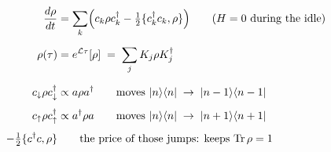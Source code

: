 \documentclass[12pt]{article}
\begin{document}
\fontsize{20}{26}\selectfont
\begin{align*}
\frac{d\rho}{dt}
  &= \sum_k \Bigl(
       c_k\rho c_k^\dagger
       -\tfrac12\{c_k^\dagger c_k,\rho\}
     \Bigr)
  \qquad (H=0\text{ during the idle}) \\[0.55em]
\rho(\tau)
  &= e^{\mathcal{L}\tau}[\rho]
  \;=\;
  \sum_j K_j\rho K_j^\dagger \\[0.65em]
c_\downarrow\rho c_\downarrow^\dagger
  &\propto a\rho a^\dagger
  \qquad\text{moves }|n\rangle\langle n|
  \;\to\;
  |n-1\rangle\langle n-1| \\[0.35em]
c_\uparrow\rho c_\uparrow^\dagger
  &\propto a^\dagger\rho a
  \qquad\text{moves }|n\rangle\langle n|
  \;\to\;
  |n+1\rangle\langle n+1| \\[0.35em]
-\tfrac12\{c^\dagger c,\rho\}
  &\qquad\text{the price of those jumps: keeps }\mathrm{Tr}\,\rho=1
\end{align*}
\end{document}
